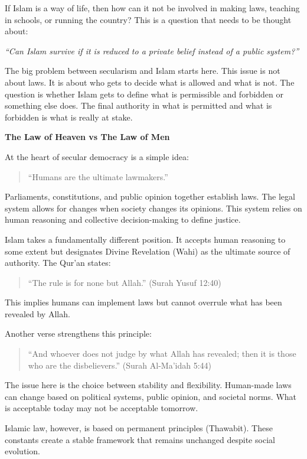 \documentclass[12pt]{article}
\begin{document}
If Islam is a way of life, then how can it not be involved in making laws, teaching in schools, or running the country? This is a question that needs to be thought about:

\textit{``Can Islam survive if it is reduced to a private belief instead of a public system?''}

The big problem between secularism and Islam starts here. This issue is not about laws. It is about who gets to decide what is allowed and what is not. The question is whether Islam gets to define what is permissible and forbidden or something else does. The final authority in what is permitted and what is forbidden is what is really at stake.

\textbf{The Law of Heaven vs The Law of Men}

At the heart of secular democracy is a simple idea:

\begin{quote}
``Humans are the ultimate lawmakers.''
\end{quote}

Parliaments, constitutions, and public opinion together establish laws. The legal system allows for changes when society changes its opinions. This system relies on human reasoning and collective decision-making to define justice.

Islam takes a fundamentally different position. It accepts human reasoning to some extent but designates Divine Revelation (Wahi) as the ultimate source of authority. The Qur’an states:

\begin{quote}
``The rule is for none but Allah.'' (Surah Yusuf 12:40)
\end{quote}

This implies humans can implement laws but cannot overrule what has been revealed by Allah.

Another verse strengthens this principle:

\begin{quote}
``And whoever does not judge by what Allah has revealed; then it is those who are the disbelievers.'' (Surah Al-Ma’idah 5:44)
\end{quote}

The issue here is the choice between stability and flexibility. Human-made laws can change based on political systems, public opinion, and societal norms. What is acceptable today may not be acceptable tomorrow.

Islamic law, however, is based on permanent principles (Thawabit). These constants create a stable framework that remains unchanged despite social evolution.
\end{document}
